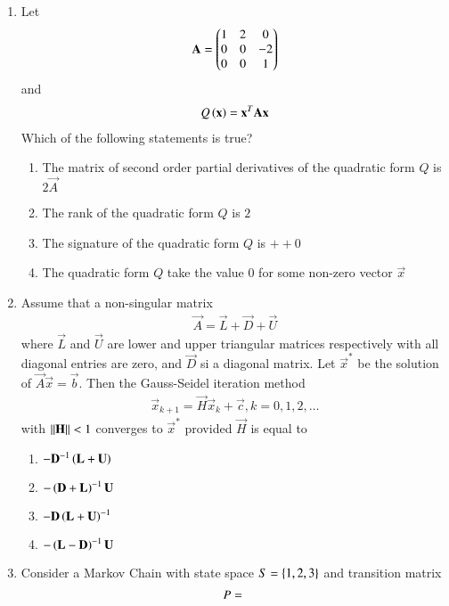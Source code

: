 \begin{enumerate}[label=\thesection.\arabic*.,ref=\thesection.\theenumi]
\begin{enumerate}
\end{enumerate}
%
\item Let
\begin{align}
\mathbf{A} =
\begin{pmatrix}
1 & 2 & 0 \\
0 & 0 & -2 \\
0 & 0 & 1
\end{pmatrix}
\end{align}
and 
\begin{align}
Q\left(\mathbf{x}\right) = \mathbf{x}^T\mathbf{A}\mathbf{x}
\end{align}
%
Which of the following statements is true?
\begin{enumerate}
\item The matrix of second order partial derivatives of the quadratic form $Q$ is $2\vec{A}$
\item The rank of the quadratic form $Q$ is $2$
\item The signature  of the quadratic form $Q$ is $++0$
\item The quadratic form $Q$ take the value 0 for some non-zero vector $\vec{x}$
\end{enumerate}
\item Assume that a non-singular matrix
\begin{align}
\vec{A} = \vec{L}+\vec{D}+\vec{U}
\end{align}
%
where $\vec{L}$ and $\vec{U}$ are lower and upper triangular matrices respectively with all
diagonal entries are zero, and $\vec{D}$ si a diagonal matrix.  Let $\vec{x}^{*}$ be the solution of
$\vec{A}\vec{x} = \vec{b}$.  Then the Gauss-Seidel iteration method 
\begin{align}
\vec{x}_{k+1} = \vec{H}\vec{x}_{k}+\vec{c}, k = 0,1,2,\dots
\end{align}
%
with $\left\lVert\mathbf{H}\right\rVert < 1$ converges to $\vec{x}^{*}$ provided $\vec{H}$ is equal to
\begin{enumerate}
\item $-\mathbf{D}^{-1}\left(\mathbf{L}+\mathbf{U}\right)$
\item $-\left(\mathbf{D}+\mathbf{L}\right)^{-1}\mathbf{U}$
\item $-\mathbf{D}\left(\mathbf{L}+\mathbf{U}\right)^{-1}$
\item $-\left(\mathbf{L}-\mathbf{D}\right)^{-1}\mathbf{U}$
\end{enumerate}
\item Consider a Markov Chain with state space $S = \left\{1,2, 3\right\}$ and transition matrix
\begin{align}
P = 
\begin{blockarray}{c@{\hspace{1pt}}rrr@{\hspace{3pt}}}

\end{blockarray}
\end{align}
\end{enumerate}
